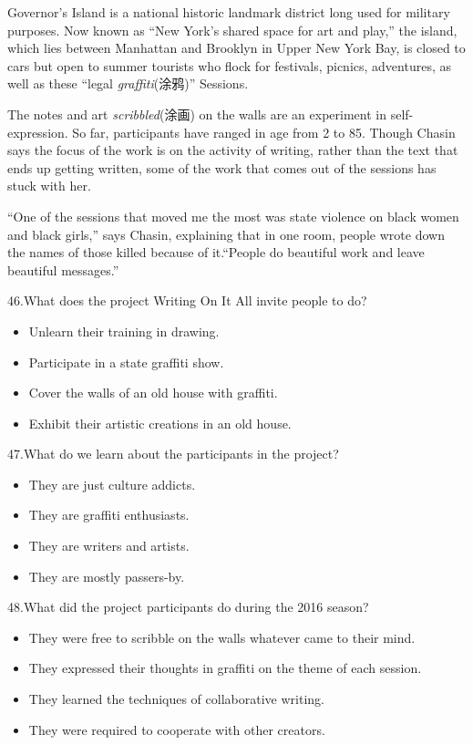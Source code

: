 \documentclass[UTF8,11pt]{ctexart}
\begin{document}
Governor’s Island is a national historic landmark district long used for military purposes. Now known as “New York’s shared space for art and play,” the island, which lies between Manhattan and Brooklyn in Upper New York Bay, is closed to cars but open to summer tourists who flock for festivals, picnics, adventures, as well as these “legal\textit{ graffiti}(涂鸦)” Sessions.


The notes and art\textit{ scribbled}(涂画) on the walls are an experiment in self-expression. So far, participants have ranged in age from 2 to 85. Though Chasin says the focus of the work is on the activity of writing, rather than the text that ends up getting written, some of the work that comes out of the sessions has stuck with her.


“One of the sessions that moved me the most was state violence on black women and black girls,” says Chasin, explaining that in one room, people wrote down the names of those killed because of it.“People do beautiful work and leave beautiful messages.”


46.What does the project Writing On It All invite people to do?


\begin{itemize}[leftmargin=2em,itemsep=.2em,topsep=.4em]\item[A.] Unlearn their training in drawing.
\item[B.] Participate in a state graffiti show.
\item[C.] Cover the walls of an old house with graffiti.
\item[D.] Exhibit their artistic creations in an old house.
\end{itemize}

47.What do we learn about the participants in the project?


\begin{itemize}[leftmargin=2em,itemsep=.2em,topsep=.4em]\item[A.] They are just culture addicts.
\item[B.] They are graffiti enthusiasts.
\item[C.] They are writers and artists.
\item[D.] They are mostly passers-by.
\end{itemize}

48.What did the project participants do during the 2016 season?


\begin{itemize}[leftmargin=2em,itemsep=.2em,topsep=.4em]\item[A.] They were free to scribble on the walls whatever came to their mind.
\item[B.] They expressed their thoughts in graffiti on the theme of each session.
\item[C.] They learned the techniques of collaborative writing.
\item[D.] They were required to cooperate with other creators.
\end{itemize}
\end{document}
